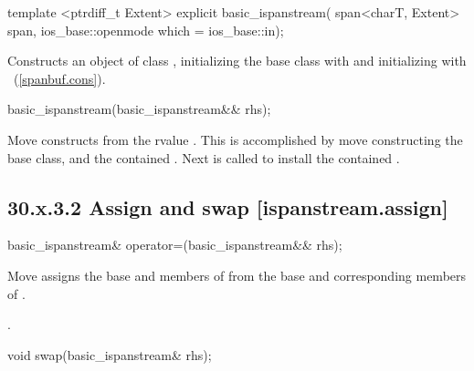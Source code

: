 \documentclass[ebook,11pt,article]{memoir}
\begin{document}
\begin{itemdecl}
template <ptrdiff_t Extent>
explicit basic_ispanstream(
  span<charT, Extent> span,
  ios_base::openmode which = ios_base::in);
\end{itemdecl}

\begin{itemdescr}
\pnum
\effects
Constructs an object of class
,
initializing the base class with
and initializing  with
~(\ref{spanbuf.cons}).
\end{itemdescr}

\begin{itemdecl}
basic_ispanstream(basic_ispanstream&& rhs);
\end{itemdecl}

\begin{itemdescr}
\pnum
\effects Move constructs from the rvalue . This
is accomplished by move constructing the base class, and the contained
.
Next  is called to
install the contained .
\end{itemdescr}

\subsection{30.x.3.2 Assign and swap [ispanstream.assign]}
\label{ispanstream.assign}

\begin{itemdecl}
basic_ispanstream& operator=(basic_ispanstream&& rhs);
\end{itemdecl}

\begin{itemdescr}
\pnum
\effects Move assigns the base and members of  from the base and corresponding
members of .

\pnum
\returns {}.
\end{itemdescr}

\begin{itemdecl}
void swap(basic_ispanstream& rhs);
\end{itemdecl}
\end{document}
